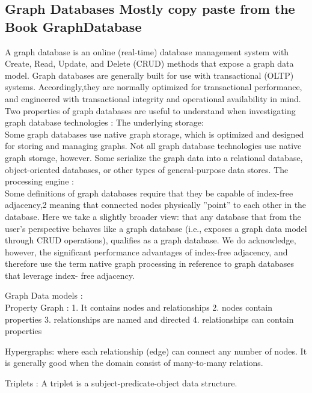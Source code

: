 \documentclass[english]{tktltiki}
\begin{document}
\subsection{Graph Databases Mostly copy paste from the Book GraphDatabase}
A graph database is an online (real-time) database management system with Create, Read, Update, and Delete (CRUD) methods that expose a graph data model. Graph databases are generally built for use with transactional (OLTP) systems. Accordingly,they are normally optimized for transactional performance, and engineered with transactional integrity and operational availability in mind.
Two properties of graph databases are useful to understand when investigating graph database technologies :
The underlying storage: \\
Some graph databases use native graph storage, which is optimized and designed for storing and managing graphs. Not all graph database technologies use native graph storage, however. Some serialize the graph data into a relational database, object-oriented databases, or other types of general-purpose data stores.
The processing engine :\\
Some definitions of graph databases require that they be capable of index-free adjacency,2 meaning that connected nodes physically ''point'' to each other in the database. Here we take a slightly broader view: that any database that from the user's perspective behaves like a graph database (i.e., exposes a graph data model through CRUD operations), qualifies as a graph database. We do acknowledge, however, the significant performance advantages of index-free adjacency, and therefore use the term native graph processing in reference to graph databases that leverage index- free adjacency.

Graph Data models : \\
Property Graph : 
1. It contains nodes and relationships
2. nodes contain properties
3. relationships are named and directed
4. relationships can contain properties

Hypergraphs:
where each relationship (edge) can connect any number of nodes. It is generally good when the domain consist of many-to-many relations.

Triplets : 
A triplet is a subject-predicate-object data structure. 
\end{document}
